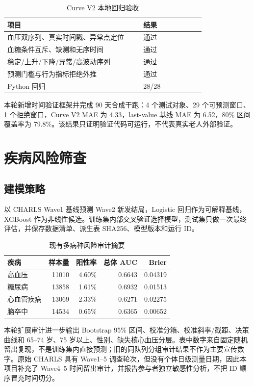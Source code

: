 \documentclass[UTF8,a4paper,zihao=-4]{ctexart}
\begin{document}
\begin{table}[ht]
\centering\caption{Curve V2 本地回归验收}
\begin{tabular}{p{0.55\linewidth}p{0.25\linewidth}}
\toprule 项目 & 结果\\\midrule
血压双序列、真实时间戳、异常点定位 & 通过\\
血糖条件互斥、缺测和无序时间 & 通过\\
稳定/上升/下降/异常/高波动序列 & 通过\\
预测门槛与行为指标拒绝外推 & 通过\\
Python 回归 & 28/28\\
\bottomrule
\end{tabular}
\end{table}

本轮新增时间验证框架并完成 90 天合成干跑：4 个测试对象、29 个可预测窗口、1 个拒绝窗口，Curve V2 MAE 为 4.33，last-value 基线 MAE 为 6.52，80\% 区间覆盖率为 79.8\%。该结果只证明验证代码可运行，不代表真实老人外部验证。

\section{疾病风险筛查}
\subsection{建模策略}
以 CHARLS Wave1 基线预测 Wave2 新发结局，Logistic 回归作为可解释基线，XGBoost 作为非线性候选。训练集内部交叉验证选择模型，测试集只做一次最终评估，并保存数据清单、派生表 SHA256、模型版本和运行 ID。

\begin{table}[ht]
\centering\caption{现有多病种风险审计摘要}
\begin{tabular}{lrrrr}
\toprule 疾病 & 样本量 & 阳性率 & 总体 AUC & Brier\\\midrule
高血压 & 11010 & 4.60\% & 0.6643 & 0.04319\\
糖尿病 & 13858 & 1.61\% & 0.6932 & 0.01513\\
心血管疾病 & 13069 & 2.33\% & 0.6271 & 0.02275\\
脑卒中 & 14534 & 0.65\% & 0.6365 & 0.00652\\
\bottomrule
\end{tabular}
\end{table}

本轮扩展审计进一步输出 Bootstrap 95\% 区间、校准分箱、校准斜率/截距、决策曲线和 65--74 岁、75 岁以上、性别、缺失核心血压分层。表中数字来自固定随机留出复现，不是训练集内直接预测；旧的同队列分组审计结果不作为主要宣传数字。原始 CHARLS 具有 Wave1--5 调查轮次，但没有个体日级测量日期，因此本项目补充了 Wave4--5 时间留出审计，并报告参与者独立敏感性分析，不把 ID 顺序冒充时间切分。
\end{document}
